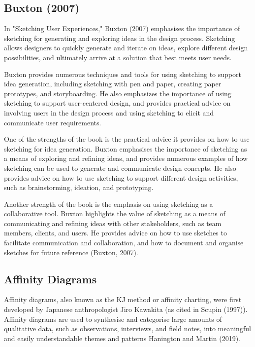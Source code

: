 \documentclass[
]{book}
\begin{document}
\hypertarget{buxtonsketchinguserexperiences2007}{%
\subsection{Buxton (2007)}\label{buxtonsketchinguserexperiences2007}}

In "Sketching User Experiences," Buxton (2007) emphasises the importance of sketching for generating and exploring ideas in the design process. Sketching allows designers to quickly generate and iterate on ideas, explore different design possibilities, and ultimately arrive at a solution that best meets user needs.

Buxton provides numerous techniques and tools for using sketching to support idea generation, including sketching with pen and paper, creating paper prototypes, and storyboarding. He also emphasizes the importance of using sketching to support user-centered design, and provides practical advice on involving users in the design process and using sketching to elicit and communicate user requirements.

One of the strengths of the book is the practical advice it provides on how to use sketching for idea generation. Buxton emphasises the importance of sketching as a means of exploring and refining ideas, and provides numerous examples of how sketching can be used to generate and communicate design concepts. He also provides advice on how to use sketching to support different design activities, such as brainstorming, ideation, and prototyping.

Another strength of the book is the emphasis on using sketching as a collaborative tool. Buxton highlights the value of sketching as a means of communicating and refining ideas with other stakeholders, such as team members, clients, and users. He provides advice on how to use sketches to facilitate communication and collaboration, and how to document and organise sketches for future reference (Buxton, 2007).

\hypertarget{affinity-diagrams}{%
\subsection{Affinity Diagrams}\label{affinity-diagrams}}

Affinity diagrams, also known as the KJ method or affinity charting, were first developed by Japanese anthropologist Jiro Kawakita (as cited in Scupin (1997)). Affinity diagrams are used to synthesise and categorise large amounts of qualitative data, such as observations, interviews, and field notes, into meaningful and easily understandable themes and patterns Hanington and Martin (2019).
\end{document}
